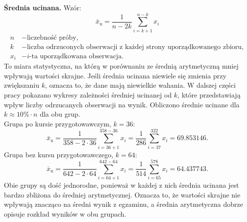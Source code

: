 \documentclass[12pt, a4paper]{article}
\begin{document}
	\textbf{Średnia ucinana.} Wzór:
	\[\bar{x}_{\text{u}} = \frac{1}{n - 2k} \sum_{i=k+1}^{n-k} x_i\]
	\[
	\begin{aligned}
		n &- \text{liczebność próby},\\
		k &- \text{liczba odrzuconych obserwacji z każdej strony uporządkowanego zbioru},\\
		x_i &- \text{$i$-ta uporządkowana obserwacja.}
	\end{aligned}
	\]
	To miara statystyczna, na którą w porównaniu ze średnią arytmetyczną mniej wpływają wartości skrajne. Jeśli średnia ucinana niewiele się zmienia przy zwiększaniu $k$, oznacza to, że dane mają niewielkie wahania. W dalszej części pracy pokazano wykresy zależności średniej ucinanej od $k$, które przedstawiają wpływ liczby odrzucanych obserwacji na wynik. Obliczono średnie ucinane dla $k\approx 10\% \cdot n$ dla obu grup.\\ 
	Grupa po kursie przygotowawczym, $k=36$:\\
	\[\bar{x}_{\text{u}} = \frac{1}{358 - 2\cdot 36} \sum_{i=36+1}^{358-36} x_i=\frac{1}{286} \sum_{i=37}^{322} x_i=69.853146.\]
	Grupa bez kursu przygotowawczego, $k=64$:\\
	\[\bar{x}_{\text{u}} = \frac{1}{642 - 2\cdot 64} \sum_{i=64+1}^{642-64} x_i=\frac{1}{514} \sum_{i=65}^{578} x_i=64.437743.\]
	Obie grupy są dość jednorodne, ponieważ w każdej z nich średnia ucinana jest bardzo zbliżona do średniej arytmetycznej. Oznacza to, że wartości skrajne nie wpływają znacząco na średni wynik z egzaminu, a średnia arytmetyczna dobrze opisuje rozkład wyników w obu grupach.\\ \\
	
\end{document}
